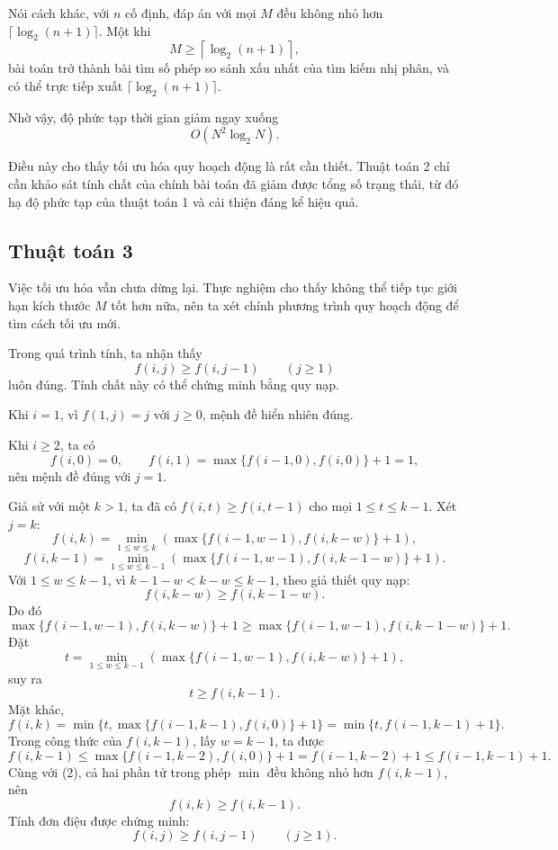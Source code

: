 \documentclass[11pt]{article}
\begin{document}
Nói cách khác, với $n$ cố định, đáp án với mọi $M$ đều không nhỏ hơn
$\lceil\log_2(n+1)\rceil$. Một khi
\[
  M\ge \left\lceil\log_2(n+1)\right\rceil,
\]
bài toán trở thành bài tìm số phép so sánh xấu nhất của tìm kiếm nhị phân, và
có thể trực tiếp xuất
$\lceil\log_2(n+1)\rceil$.

Nhờ vậy, độ phức tạp thời gian giảm ngay xuống
\[
  O(N^2\log_2 N).
\]

Điều này cho thấy tối ưu hóa quy hoạch động là rất cần thiết. Thuật toán 2 chỉ
cần khảo sát tính chất của chính bài toán đã giảm được tổng số trạng thái, từ
đó hạ độ phức tạp của thuật toán 1 và cải thiện đáng kể hiệu quả.

\subsection{Thuật toán 3}

Việc tối ưu hóa vẫn chưa dừng lại. Thực nghiệm cho thấy không thể tiếp tục
giới hạn kích thước $M$ tốt hơn nữa, nên ta xét chính phương trình quy hoạch
động để tìm cách tối ưu mới.

Trong quá trình tính, ta nhận thấy
\[
  f(i,j)\ge f(i,j-1)\qquad (j\ge 1)
\]
luôn đúng. Tính chất này có thể chứng minh bằng quy nạp.

Khi $i=1$, vì $f(1,j)=j$ với $j\ge 0$, mệnh đề hiển nhiên đúng.

Khi $i\ge 2$, ta có
\[
  f(i,0)=0,\qquad
  f(i,1)=\max\{f(i-1,0),f(i,0)\}+1=1,
\]
nên mệnh đề đúng với $j=1$.

Giả sử với một $k>1$, ta đã có $f(i,t)\ge f(i,t-1)$ cho mọi $1\le t\le k-1$.
Xét $j=k$:
\[
  f(i,k)=
  \min_{1\le w\le k}
  \left(\max\{f(i-1,w-1),f(i,k-w)\}+1\right),
\]
\[
  f(i,k-1)=
  \min_{1\le w\le k-1}
  \left(\max\{f(i-1,w-1),f(i,k-1-w)\}+1\right).
\]
Với $1\le w\le k-1$, vì $k-1-w<k-w\le k-1$, theo giả thiết quy nạp:
\[
  f(i,k-w)\ge f(i,k-1-w).
\]
Do đó
\[
\max\{f(i-1,w-1),f(i,k-w)\}+1
\ge
\max\{f(i-1,w-1),f(i,k-1-w)\}+1.
\]
Đặt
\[
  t=
  \min_{1\le w\le k-1}
  \left(\max\{f(i-1,w-1),f(i,k-w)\}+1\right),
\]
suy ra
\[
  t\ge f(i,k-1). \tag{2}
\]
Mặt khác,
\[
  f(i,k)=\min\{t,\max\{f(i-1,k-1),f(i,0)\}+1\}
        =\min\{t,f(i-1,k-1)+1\}.
\]
Trong công thức của $f(i,k-1)$, lấy $w=k-1$, ta được
\[
  f(i,k-1)\le
  \max\{f(i-1,k-2),f(i,0)\}+1
  =f(i-1,k-2)+1
  \le f(i-1,k-1)+1.
\]
Cùng với (2), cả hai phần tử trong phép $\min$ đều không nhỏ hơn $f(i,k-1)$,
nên
\[
  f(i,k)\ge f(i,k-1).
\]
Tính đơn điệu được chứng minh:
\[
  f(i,j)\ge f(i,j-1)\qquad (j\ge 1). \tag{3}
\]
\end{document}
